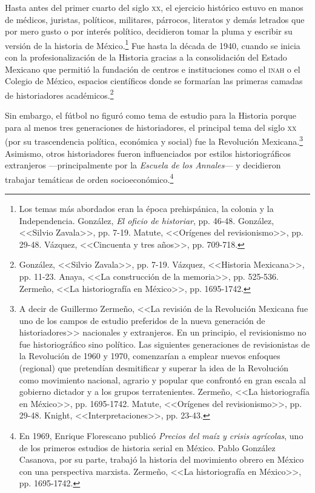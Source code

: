 \documentclass[11pt,a5paper,twoside]{book} %
\begin{document}
Hasta antes del primer cuarto del siglo \textsc{xx}, el ejercicio histórico estuvo en manos de
médicos, juristas, políticos, militares, párrocos, literatos y demás letrados que por mero gusto
o por interés político, decidieron tomar la pluma y escribir su versión de la historia de
México.\footnote{Los temas más abordados eran la época prehispánica, la colonia y la Independencia. González, \emph{El oficio de historiar}, pp. 46-48. González, <<Silvio Zavala>>, pp. 7-19. Matute, <<Orígenes del revisionismo>>, pp. 29-48. Vázquez, <<Cincuenta y tres años>>, pp. 709-718.} Fue hasta la década de 1940, cuando se inicia con la profesionalización de la Historia gracias a la consolidación del Estado Mexicano que permitió la fundación de centros e instituciones como el \textsc{inah} o el Colegio de México, espacios científicos donde se
formarían las primeras camadas de historiadores académicos.\footnote{González, <<Silvio Zavala>>, pp. 7-19. Vázquez, <<Historia Mexicana>>, pp. 11-23. Anaya, <<La construcción de la memoria>>, pp. 525-536. Zermeño, <<La historiografía en México>>, pp. 1695-1742.}

Sin embargo, el fútbol no figuró como tema de estudio para la Historia porque para
al menos tres generaciones de historiadores, el principal tema del siglo \textsc{xx} (por su
trascendencia política, económica y social) fue la Revolución Mexicana.\footnote{A decir de Guillermo Zermeño, <<La revisión de la Revolución Mexicana fue uno de los campos de estudio preferidos de la nueva generación de historiadores>> nacionales y extranjeros. En un principio, el revisionismo no fue historiográfico sino político. Las siguientes generaciones de revisionistas de la Revolución de 1960 y 1970, comenzarían a emplear nuevos enfoques (regional) que pretendían desmitificar y superar la idea de la Revolución como movimiento nacional, agrario y popular que confrontó en gran escala al gobierno dictador y a los grupos terratenientes. Zermeño, <<La historiografía en México>>, pp. 1695-1742. Matute, <<Orígenes del revisionismo>>, pp. 29-48. Knight, <<Interpretaciones>>, pp. 23-43.} Asimismo, otros
historiadores fueron influenciados por estilos historiográficos extranjeros ---principalmente
por la \emph{Escuela de los Annales}--- y decidieron trabajar temáticas de orden socioeconómico.\footnote{En 1969, Enrique Florescano publicó \emph{Precios del maíz y crisis agrícolas}, uno de los primeros estudios de historia serial en México. Pablo González Casanova, por su parte, trabajó la historia del movimiento obrero en México con una perspectiva marxista. Zermeño, <<La historiografía en México>>, pp. 1695-1742.}
\end{document}
